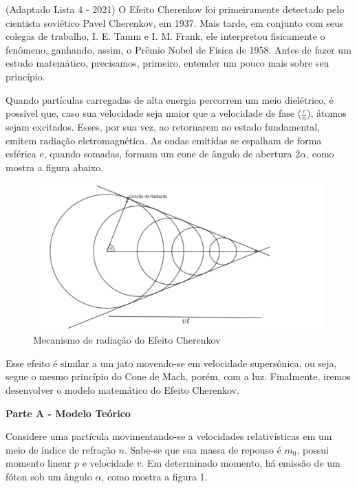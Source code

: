 \documentclass[11pt]{article}
\begin{document}
\begin{pproblem} (Adaptado Lista 4 - 2021)
    O Efeito Cherenkov foi primeiramente detectado pelo cientista soviético
    Pavel Cherenkov, em 1937. Mais tarde, em conjunto com seus colegas de trabalho, I. E. Tamm e
    I. M. Frank, ele interpretou fisicamente o fenômeno, ganhando, assim, o Prêmio Nobel de Física
    de 1958. Antes de fazer um estudo matemático, precisamos, primeiro, entender um pouco mais
    sobre seu princípio.

    Quando partículas carregadas de alta energia percorrem um meio dielétrico, é possível que, caso
    sua velocidade seja maior que a velocidade de fase ($\frac{c}{n}$), átomos sejam excitados. Esses, por sua
    vez, ao retornarem ao estado fundamental, emitem radiação eletromagnética. As ondas emitidas
    se espalham de forma esférica e, quando somadas, formam um cone de ângulo de abertura $2\alpha$,
    como mostra a figura abaixo.
    \begin{figure}[H]
      \centering
      \includegraphics[width=0.9\linewidth]{imagens/cherenkov.png}  
      \caption{Mecanismo de radiação do Efeito Cherenkov}
    \end{figure}

    Esse efeito é similar a um jato movendo-se em velocidade supersônica, ou seja, segue o mesmo
    princípio do Cone de Mach, porém, com a luz. Finalmente, iremos desenvolver o modelo matemático do Efeito Cherenkov.

    \begin{center}
        \textbf{Parte A - Modelo Teórico}    
    \end{center}
    
    Considere uma partícula movimentando-se a velocidades relativísticas em um meio de índice de
    refração $n$. Sabe-se que sua massa de repouso é $m_0$, possui momento linear $p$ e velocidade $v$. Em
    determinado momento, há emissão de um fóton sob um ângulo $\alpha$, como mostra a figura 1.


\end{pproblem}
\end{document}
